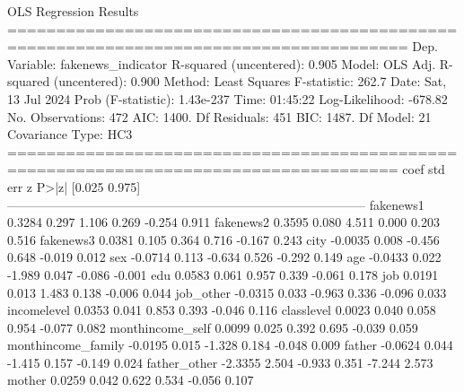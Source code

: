                                  OLS Regression Results                                
=======================================================================================
Dep. Variable:     fakenews_indicator   R-squared (uncentered):                   0.905
Model:                            OLS   Adj. R-squared (uncentered):              0.900
Method:                 Least Squares   F-statistic:                              262.7
Date:                Sat, 13 Jul 2024   Prob (F-statistic):                   1.43e-237
Time:                        01:45:22   Log-Likelihood:                         -678.82
No. Observations:                 472   AIC:                                      1400.
Df Residuals:                     451   BIC:                                      1487.
Df Model:                          21                                                  
Covariance Type:                  HC3                                                  
======================================================================================
                         coef    std err          z      P>|z|      [0.025      0.975]
--------------------------------------------------------------------------------------
fakenews1              0.3284      0.297      1.106      0.269      -0.254       0.911
fakenews2              0.3595      0.080      4.511      0.000       0.203       0.516
fakenews3              0.0381      0.105      0.364      0.716      -0.167       0.243
city                  -0.0035      0.008     -0.456      0.648      -0.019       0.012
sex                   -0.0714      0.113     -0.634      0.526      -0.292       0.149
age                   -0.0433      0.022     -1.989      0.047      -0.086      -0.001
edu                    0.0583      0.061      0.957      0.339      -0.061       0.178
job                    0.0191      0.013      1.483      0.138      -0.006       0.044
job_other             -0.0315      0.033     -0.963      0.336      -0.096       0.033
incomelevel            0.0353      0.041      0.853      0.393      -0.046       0.116
classlevel             0.0023      0.040      0.058      0.954      -0.077       0.082
monthincome_self       0.0099      0.025      0.392      0.695      -0.039       0.059
monthincome_family    -0.0195      0.015     -1.328      0.184      -0.048       0.009
father                -0.0624      0.044     -1.415      0.157      -0.149       0.024
father_other          -2.3355      2.504     -0.933      0.351      -7.244       2.573
mother                 0.0259      0.042      0.622      0.534      -0.056       0.107
